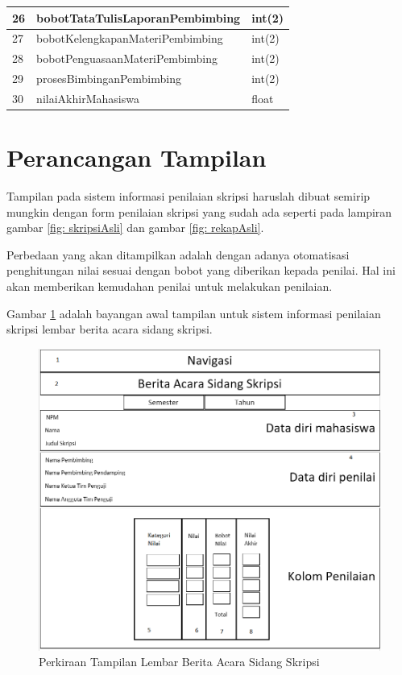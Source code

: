 \begin{table}[H]
\centering
	\begin{tabular}{| m{0.75cm} | m{7cm} | m{3cm} |}
	\hline
		26 & bobotTataTulisLaporanPembimbing & int(2)\\
		\hline
		27 & bobotKelengkapanMateriPembimbing & int(2)\\
		\hline
		28 & bobotPenguasaanMateriPembimbing & int(2)\\
		\hline
		29 & prosesBimbinganPembimbing & int(2)\\
		\hline
		30 & nilaiAkhirMahasiswa & float\\
		\hline
		\end{tabular}
	\end{table}
	
	\section{Perancangan Tampilan}
	\label{sec: perancanganTampilan}
	
	Tampilan pada sistem informasi penilaian skripsi haruslah dibuat semirip mungkin dengan form penilaian skripsi yang sudah ada seperti pada lampiran gambar \ref{fig: skripsiAsli} dan gambar \ref{fig: rekapAsli}.
	
	Perbedaan yang akan ditampilkan adalah dengan adanya otomatisasi penghitungan nilai sesuai dengan bobot yang diberikan kepada penilai. Hal ini akan memberikan kemudahan penilai untuk melakukan penilaian.
	
	Gambar \ref{fig:beritaacara} adalah bayangan awal tampilan untuk sistem informasi penilaian skripsi lembar berita acara sidang skripsi.
	\begin{figure}[H]
		\centering
		\includegraphics[scale=0.75]{Gambar/beritaacara}
		\caption{Perkiraan Tampilan Lembar Berita Acara Sidang Skripsi}
		\label{fig:beritaacara}
	\end{figure}
	
